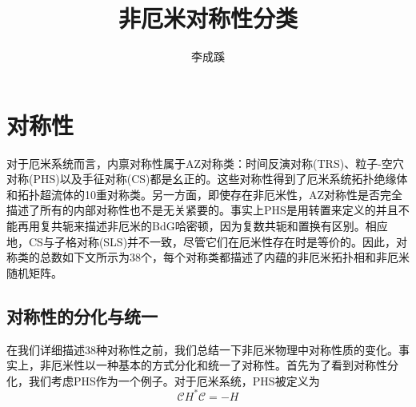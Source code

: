 \documentclass{article}
\newcommand{\mC}{\mathcal{C}}
\begin{document}
\title{非厄米对称性分类}
\author{李成蹊}
\date{}
\maketitle
\section{对称性}
对于厄米系统而言，内禀对称性属于AZ对称类：时间反演对称(TRS)、粒子-空穴对称(PHS)以及手征对称(CS)都是幺正的。这些对称性得到了厄米系统拓扑绝缘体和拓扑超流体的10重对称类。另一方面，即使存在非厄米性，AZ对称性是否完全描述了所有的内部对称性也不是无关紧要的。事实上PHS是用转置来定义的并且不能再用复共轭来描述非厄米的BdG哈密顿，因为复数共轭和置换有区别。相应地，CS与子格对称(SLS)并不一致，尽管它们在厄米性存在时是等价的。因此，对称类的总数如下文所示为38个，每个对称类都描述了内蕴的非厄米拓扑相和非厄米随机矩阵。

\subsection{对称性的分化与统一}
在我们详细描述38种对称性之前，我们总结一下非厄米物理中对称性质的变化。事实上，非厄米性以一种基本的方式分化和统一了对称性。首先为了看到对称性分化，我们考虑PHS作为一个例子。对于厄米系统，PHS被定义为
\begin{equation}
    \mC H^*\mC=-H
\end{equation}
\end{document}

